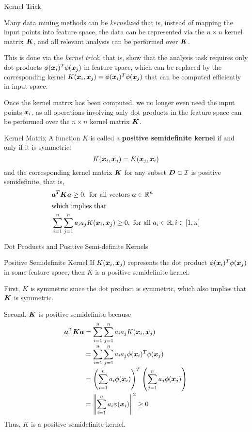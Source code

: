 \begin{frame}{Kernel Trick}

  \smallskip
  Many data mining methods can be {\em kernelized}
that is, instead of mapping the input points into feature space, the data
can be represented via the $n \times n$ kernel matrix ${\boldsymbol K}$, and all
relevant analysis can be performed over ${\boldsymbol K}$. 

\medskip
This is done via the
{\em kernel trick}, that is, show that the analysis task
requires only dot products $\phi({\boldsymbol x}_i)^T \phi({\boldsymbol x}_{j})$ in feature space,
which can be replaced by the corresponding kernel $K({\boldsymbol x}_i, {\boldsymbol x}_{j}) =
\phi({\boldsymbol x}_i)^T \phi({\boldsymbol x}_{j})$ that can be computed eff\/{i}ciently in input
space.  

\medskip
Once the kernel matrix has been computed, we no longer even need
the input points ${\boldsymbol x}_i$, as all operations involving only dot products
in the feature space can be performed over the $n \times n$ kernel
matrix ${\boldsymbol K}$. 

\end{frame}


\begin{frame}{Kernel Matrix}
A function $K$ is called a {\bf positive semidef\/{i}nite kernel} if and
only if it is symmetric: $$K({\boldsymbol x}_i, {\boldsymbol x}_{j}) = K({\boldsymbol x}_{j}, {\boldsymbol x}_i)$$ and the
corresponding kernel matrix ${\boldsymbol K}$ for any subset ${\boldsymbol D} \subset {\mathcal I}$ is
positive semidef\/{i}nite, that is,
\begin{align*}
    & {\boldsymbol a}^T {\boldsymbol K} {\boldsymbol a} \ge 0, \text{ for all vectors } {\boldsymbol a} \in
    {\mathord{\mathbb R}}^n\nonumber\\
    \shortintertext{which implies that}
     & \displaystyle \sum_{i=1}^n \displaystyle \sum_{j=1}^n a_i a_{j} K({\boldsymbol x}_i, {\boldsymbol x}_{j}) \ge
    0, \text{ for all } a_i \in {\mathord{\mathbb R}}, i \in [1,n]
\end{align*}
\end{frame}


\begin{frame}{Dot Products and Positive Semi-definite Kernels}
\small

  \begin{block}{Positive Semidef\/{i}nite Kernel}
If $K({\boldsymbol x}_i, {\boldsymbol x}_{j})$ represents the dot
product $\phi({\boldsymbol x}_i)^T\phi({\boldsymbol x}_{j})$ in some feature space, then $K$ is a
positive semidef\/{i}nite kernel. 
\end{block}

\bigskip
F{i}rst, $K$ is symmetric since the dot product is
symmetric, which also implies that ${\boldsymbol K}$ is symmetric.

\bigskip
Second, ${\boldsymbol K}$ is positive semidef\/{i}nite because
\begin{align*}
  {\boldsymbol a}^T {\boldsymbol K} {\boldsymbol a} & = \sum_{i=1}^n \sum_{j=1}^n a_i a_{j} K({\boldsymbol x}_i, {\boldsymbol x}_{j})\\[-2pt]
  & =  \sum_{i=1}^n \sum_{j=1}^n a_i a_{j} \phi({\boldsymbol x}_i)^T \phi({\boldsymbol x}_{j})\\[-2pt]
& = \left(\sum_{i=1}^n a_i \phi({\boldsymbol x}_i)\right)^T
    \left(\sum_{j=1}^n a_{j}\phi({\boldsymbol x}_{j})\right)\\[-2pt]
& = \left\lVert\sum_{i=1}^n a_i \phi({\boldsymbol x}_i)\right\rVert^2 \ge 0
\end{align*}
Thus, $K$ is a positive semidef\/{i}nite kernel.
\end{frame}



